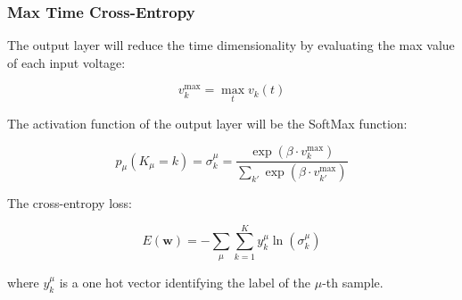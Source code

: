 \subsubsection{Max Time Cross-Entropy}

The output layer will reduce the time dimensionality by evaluating the max value of each input voltage:

\begin{equation}
    v_k^{\text{max}} = \max_{t} v_k(t)
\end{equation}

The activation function of the output layer will be the SoftMax function:

\begin{equation}
    p_{\mu}(K_{\mu}=k) = \sigma_k^{\mu} = \frac{\exp(\beta \cdot v_k^{\text{max}})}{\sum_{k'} \exp(\beta \cdot v_{k'}^{\text{max}})}
\end{equation}

The cross-entropy loss:

\begin{equation}
    E(\mathbf{w}) = -\sum_{\mu} \sum_{k=1}^K y_k^{\mu} \ln(\sigma_k^{\mu})
\end{equation}

where \( y_k^{\mu} \) is a one hot vector identifying the label of the \(\mu\)-th sample.
